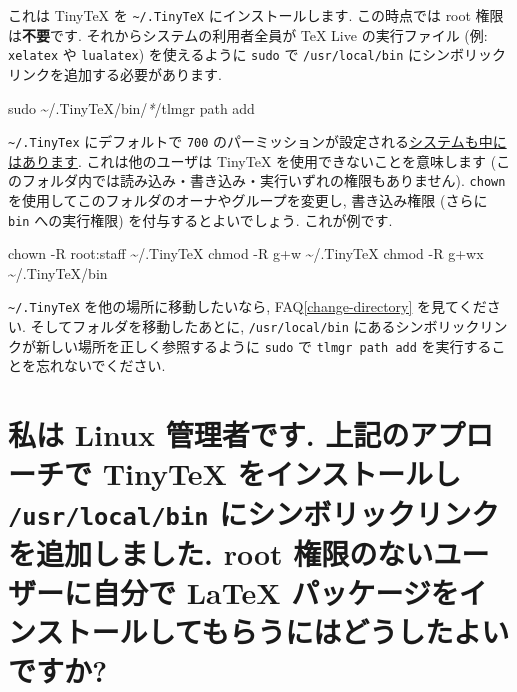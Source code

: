 \documentclass[
  xelatex,ja=standard,jafont=noto]{bxjsreport}
\newenvironment{Shaded}{\begin{snugshade}}{\end{snugshade}}
\newcommand{\AttributeTok}[1]{\textcolor[rgb]{0.77,0.63,0.00}{#1}}
\newcommand{\FunctionTok}[1]{\textcolor[rgb]{0.00,0.00,0.00}{#1}}
\newcommand{\NormalTok}[1]{#1}
\newcommand{\PreprocessorTok}[1]{\textcolor[rgb]{0.56,0.35,0.01}{\textit{#1}}}
\begin{document}
これは TinyTeX を \texttt{\textasciitilde{}/.TinyTeX}
にインストールします. この時点では root 権限は\textbf{不要}です.
それからシステムの利用者全員が TeX Live の実行ファイル (例:
\texttt{xelatex} や \texttt{lualatex}) を使えるように \texttt{sudo} で
\texttt{/usr/local/bin} にシンボリックリンクを追加する必要があります.

\begin{Shaded}
\begin{Highlighting}[]
\FunctionTok{sudo}\NormalTok{ \textasciitilde{}/.TinyTeX/bin/}\PreprocessorTok{*}\NormalTok{/tlmgr path add}
\end{Highlighting}
\end{Shaded}

\texttt{\textasciitilde{}/.TinyTex} にデフォルトで \texttt{700}
のパーミッションが設定される\href{https://github.com/yihui/tinytex/issues/37}{システムも中にはあります}.
これは他のユーザは TinyTeX を使用できないことを意味します
(このフォルダ内では読み込み・書き込み・実行いずれの権限もありません).
\texttt{chown} を使用してこのフォルダのオーナやグループを変更し,
書き込み権限 (さらに \texttt{bin} への実行権限)
を付与するとよいでしょう. これが例です.

\begin{Shaded}
\begin{Highlighting}[]
\FunctionTok{chown} \AttributeTok{{-}R}\NormalTok{ root:staff \textasciitilde{}/.TinyTeX}
\FunctionTok{chmod} \AttributeTok{{-}R}\NormalTok{ g+w \textasciitilde{}/.TinyTeX}
\FunctionTok{chmod} \AttributeTok{{-}R}\NormalTok{ g+wx \textasciitilde{}/.TinyTeX/bin}
\end{Highlighting}
\end{Shaded}

\texttt{\textasciitilde{}/.TinyTeX} を他の場所に移動したいなら,
FAQ\ref{change-directory} を見てください.
そしてフォルダを移動したあとに, \texttt{/usr/local/bin}
にあるシンボリックリンクが新しい場所を正しく参照するように \texttt{sudo}
で \texttt{tlmgr\ path\ add} を実行することを忘れないでください.

\hypertarget{non-root-package-installation}{%
\section{\texorpdfstring{私は Linux 管理者です. 上記のアプローチで
TinyTeX をインストールし \texttt{/usr/local/bin}
にシンボリックリンクを追加しました. root 権限のないユーザーに自分で
LaTeX
パッケージをインストールしてもらうにはどうしたよいですか?}{私は Linux 管理者です. 上記のアプローチで TinyTeX をインストールし /usr/local/bin にシンボリックリンクを追加しました. root 権限のないユーザーに自分で LaTeX パッケージをインストールしてもらうにはどうしたよいですか?}}\label{non-root-package-installation}}
\end{document}
